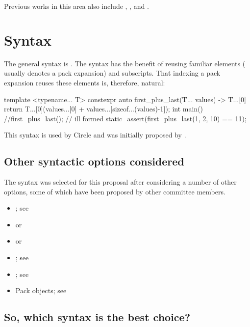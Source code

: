 \documentclass{wg21}
\begin{document}
Previous works in this area also include , ,  and .

\section{Syntax}

The general syntax is .
The syntax has the benefit of reusing familiar elements ( usually denotes a pack expansion) and \tcode{[]} subscripts.
That indexing a pack expansion reuses these elements is, therefore, natural:

\begin{colorblock}
template <typename... T>
constexpr auto first_plus_last(T... values) ->  T...[0] {
    return T...[0](values...[0] + values...[sizeof...(values)-1]);
}
int main() {
    //first_plus_last(); // ill formed
    static_assert(first_plus_last(1, 2, 10) == 11);
}
\end{colorblock}

This syntax is used by Circle and was initially proposed by .

\subsection{Other syntactic options considered}

The 
syntax was selected for this proposal after considering a
number of other options, some of which have been proposed by other
committee members.
\begin{itemize}
\item {}; see 
\item {} or 
\item {} or 
\item {}; see 
\item {}; see 
\item Pack objects; see 
\end{itemize}

\subsection{So, which syntax is the best choice?}
\end{document}
